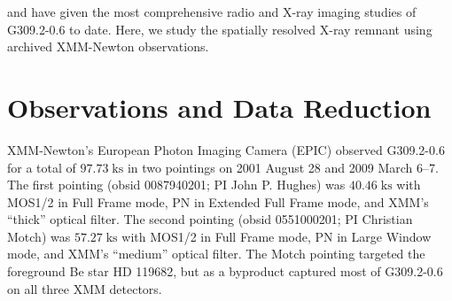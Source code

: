 \documentclass[preprint2,tighten,trackchanges]{aastex6}
\newcommand*{\mt}{\mathrm}
\newcommand*{\unit}[1]{\;\mt{#1}}  %
\begin{document}



 and  have given the most
comprehensive radio and X-ray imaging studies of G309.2-0.6 to date.
Here, we study the spatially resolved X-ray remnant using archived XMM-Newton
observations.

%
%
%
%
%
%
%


\section{Observations and Data Reduction} \label{sec:obs}

XMM-Newton's European Photon Imaging Camera (EPIC) observed G309.2-0.6 for a
total of $97.73 \unit{ks}$ in two pointings on 2001 August 28 and 2009 March
6--7.  The first pointing (obsid 0087940201; PI John P. Hughes) was $40.46
\unit{ks}$ with MOS1/2 in Full Frame mode, PN in Extended Full Frame mode, and
XMM's ``thick'' optical filter.
The second pointing (obsid 0551000201; PI Christian Motch) was $57.27
\unit{ks}$  with MOS1/2 in Full Frame mode, PN in Large Window mode, and XMM's
``medium'' optical filter.
The Motch pointing targeted the foreground Be star HD 119682, but as a
byproduct captured most of G309.2-0.6 on all three XMM detectors.
\end{document}
